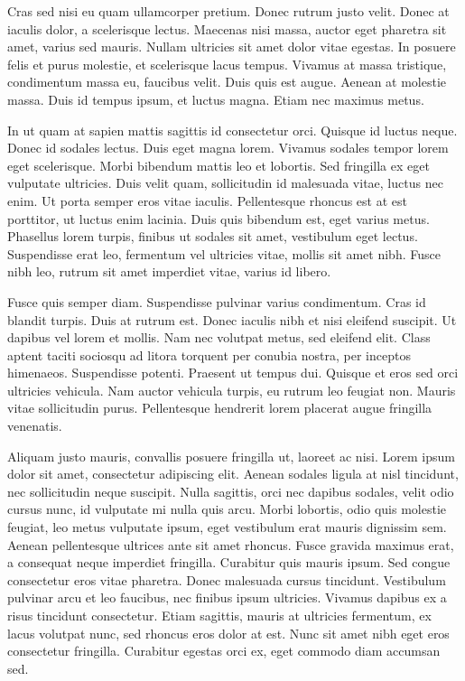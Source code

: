 Cras sed nisi eu quam ullamcorper pretium. Donec rutrum justo velit. Donec at iaculis dolor, a scelerisque lectus. Maecenas nisi massa, auctor eget pharetra sit amet, varius sed mauris. Nullam ultricies sit amet dolor vitae egestas. In posuere felis et purus molestie, et scelerisque lacus tempus. Vivamus at massa tristique, condimentum massa eu, faucibus velit. Duis quis est augue. Aenean at molestie massa. Duis id tempus ipsum, et luctus magna. Etiam nec maximus metus.

In ut quam at sapien mattis sagittis id consectetur orci. Quisque id luctus neque. Donec id sodales lectus. Duis eget magna lorem. Vivamus sodales tempor lorem eget scelerisque. Morbi bibendum mattis leo et lobortis. Sed fringilla ex eget vulputate ultricies. Duis velit quam, sollicitudin id malesuada vitae, luctus nec enim. Ut porta semper eros vitae iaculis. Pellentesque rhoncus est at est porttitor, ut luctus enim lacinia. Duis quis bibendum est, eget varius metus. Phasellus lorem turpis, finibus ut sodales sit amet, vestibulum eget lectus. Suspendisse erat leo, fermentum vel ultricies vitae, mollis sit amet nibh. Fusce nibh leo, rutrum sit amet imperdiet vitae, varius id libero.

Fusce quis semper diam. Suspendisse pulvinar varius condimentum. Cras id blandit turpis. Duis at rutrum est. Donec iaculis nibh et nisi eleifend suscipit. Ut dapibus vel lorem et mollis. Nam nec volutpat metus, sed eleifend elit. Class aptent taciti sociosqu ad litora torquent per conubia nostra, per inceptos himenaeos. Suspendisse potenti. Praesent ut tempus dui. Quisque et eros sed orci ultricies vehicula. Nam auctor vehicula turpis, eu rutrum leo feugiat non. Mauris vitae sollicitudin purus. Pellentesque hendrerit lorem placerat augue fringilla venenatis.

Aliquam justo mauris, convallis posuere fringilla ut, laoreet ac nisi. Lorem ipsum dolor sit amet, consectetur adipiscing elit. Aenean sodales ligula at nisl tincidunt, nec sollicitudin neque suscipit. Nulla sagittis, orci nec dapibus sodales, velit odio cursus nunc, id vulputate mi nulla quis arcu. Morbi lobortis, odio quis molestie feugiat, leo metus vulputate ipsum, eget vestibulum erat mauris dignissim sem. Aenean pellentesque ultrices ante sit amet rhoncus. Fusce gravida maximus erat, a consequat neque imperdiet fringilla. Curabitur quis mauris ipsum. Sed congue consectetur eros vitae pharetra. Donec malesuada cursus tincidunt. Vestibulum pulvinar arcu et leo faucibus, nec finibus ipsum ultricies. Vivamus dapibus ex a risus tincidunt consectetur. Etiam sagittis, mauris at ultricies fermentum, ex lacus volutpat nunc, sed rhoncus eros dolor at est. Nunc sit amet nibh eget eros consectetur fringilla. Curabitur egestas orci ex, eget commodo diam accumsan sed.

